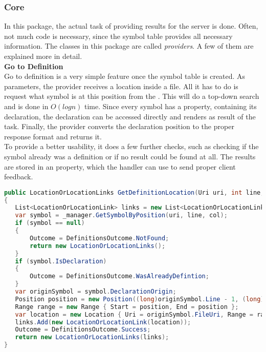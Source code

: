 \subsubsection{Core}
In this package, the actual task of providing results for the server is done.
Often, not much code is necessary, since the symbol table provides all necessary information.
The classes in this package are called \textit{providers}.
A few of them are explained more in detail.\\

\textbf{Go to Definition}\\
Go to definition is a very simple feature once the symbol table is created.
As parameters, the provider receives a location inside a file.
All it has to do is request what symbol is at this position from the .
This will do a top-down search and is done in $O(logn)$ time.
Since every symbol has a property, containing its declaration, the declaration can be accessed directly and renders as result of the task.
Finally, the provider converts the declaration position to the proper response format and returns it.\\

To provide a better usability, it does a few further checks, such as checking if the symbol already was a definition or if no result could be found at all.
The results are stored in an  property, which the handler can use to send proper client feedback.\\

\begin{lstlisting}[language=csharp, caption={Providing Goto Definition}, captionpos=b, label={lst:gotoCore}]
public LocationOrLocationLinks GetDefinitionLocation(Uri uri, int line, int col)
{
   List<LocationOrLocationLink> links = new List<LocationOrLocationLink>();
   var symbol = _manager.GetSymbolByPosition(uri, line, col);
   if (symbol == null)
   {
       Outcome = DefinitionsOutcome.NotFound;
       return new LocationOrLocationLinks();
   }
   if (symbol.IsDeclaration)
   {
       Outcome = DefinitionsOutcome.WasAlreadyDefintion;
   }
   var originSymbol = symbol.DeclarationOrigin;
   Position position = new Position((long)originSymbol.Line - 1, (long)originSymbol.ColumnStart - 1);
   Range range = new Range { Start = position, End = position };
   var location = new Location { Uri = originSymbol.FileUri, Range = range };
   links.Add(new LocationOrLocationLink(location));
   Outcome = DefinitionsOutcome.Success;
   return new LocationOrLocationLinks(links);
}
\end{lstlisting}

